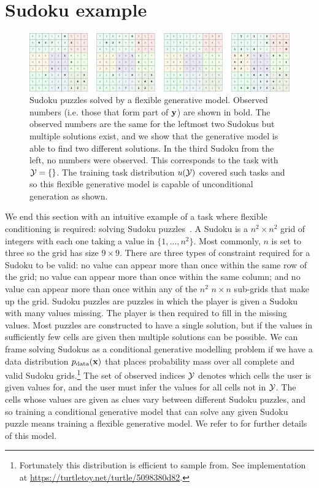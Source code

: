 \section{Sudoku example}
\begin{figure}[t]
    \centering
    \includegraphics[width=\textwidth]{figs/thesis/sudoku_panel.pdf}
    \caption{Sudoku puzzles solved by a flexible generative model. Observed numbers (i.e. those that form part of ${\mathbf{y}}$) are shown in bold. The observed numbers are the same for the leftmost two Sudokus but multiple solutions exist, and we show that the generative model is able to find two different solutions. In the third Sudoku from the left, no numbers were observed. This corresponds to the task with ${\mathcal{Y}} = \{\}$. The training task distribution $u({\mathcal{Y}})$ covered such tasks and so this flexible generative model is capable of unconditional generation as shown. }
    \label{fig:sudoku-panel}
\end{figure}
We end this section with an intuitive example of a task where flexible conditioning is required: solving Sudoku puzzles~\citep{weilbach2023graphically}. A Sudoku is a $n^2 \times n^2$ grid of integers with each one taking a value in $\{1,\ldots,n^2\}$. Most commonly, $n$ is set to three so the grid has size $9 \times 9$. There are three types of constraint required for a Sudoku to be valid: no value can appear more than once within the same row of the grid; no value can appear more than once within the same column; and no value can appear more than once within any of the $n^2$ $n \times n$ sub-grids that make up the grid. Sudoku puzzles are puzzles in which the player is given a Sudoku with many values missing. The player is then required to fill in the missing values. Most puzzles are constructed to have a single solution, but if the values in sufficiently few cells are given then multiple solutions can be possible. We can frame solving Sudokus as a conditional generative modelling problem if we have a data distribution $p_{\rm{data}}({\mathbf{x}})$ that places probability mass over all complete and valid Sudoku grids.\footnote{Fortunately this distribution is efficient to sample from. See implementation at \url{https://turtletoy.net/turtle/5098380d82}.} The set of observed indices ${\mathcal{Y}}$ denotes which cells the user is given values for, and the user must infer the values for all cells not in ${\mathcal{Y}}$. The cells whose values are given as clues vary between different Sudoku puzzles, and so training a conditional generative model that can solve any given Sudoku puzzle means training a flexible generative model. We refer to \citet{weilbach2023graphically} for further details of this model.

